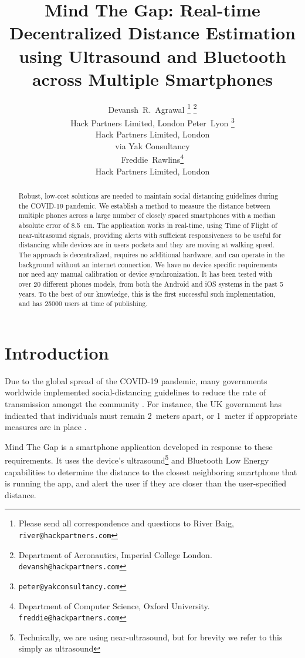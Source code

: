 \documentclass{article}
\title{Mind The Gap: Real-time Decentralized Distance Estimation using Ultrasound and Bluetooth across Multiple Smartphones}
\author{
  Devansh~R.~Agrawal \thanks{Please send all correspondence and questions to River Baig, \texttt{river@hackpartners.com}} \thanks{Department of Aeronautics, Imperial College London. \texttt{devansh@hackpartners.com}}\\
  Hack Partners Limited, London
   \And
 Peter~Lyon  \thanks{\texttt{peter@yakconsultancy.com}}\\
  Hack Partners Limited, London\\
  via Yak Consultancy
  \\
  \And
  Freddie~Rawlins\thanks{Department of Computer Science, Oxford University. \texttt{freddie@hackpartners.com}}\\
  Hack Partners Limited, London\\
  
}
\begin{document}
\maketitle

\begin{abstract}

Robust, low-cost solutions are needed to maintain social distancing guidelines during the COVID-19 pandemic. We establish a method to measure the distance between multiple phones across a large number of closely spaced smartphones with a median absolute error of 8.5~cm. The application works in real-time, using Time of Flight of near-ultrasound signals, providing alerts with sufficient responsiveness to be useful for distancing while devices are in users pockets and they are moving at walking speed. The approach is decentralized, requires no additional hardware, and can operate in the background without an internet connection. We have no device specific requirements nor need any manual calibration or device synchronization. It has been tested with over 20 different phones models, from both the Android and iOS systems in the past 5 years.
To the best of our knowledge, this is the first successful such implementation, and has 25000 users at time of publishing.
\end{abstract}



\section{Introduction}

Due to the global spread of the COVID-19 pandemic, many governments worldwide implemented social-distancing guidelines to reduce the rate of transmission amongst the community \cite{WHO2020}. For instance, the UK government has indicated that individuals must remain 2~meters apart, or 1~meter if appropriate measures are in place \cite{UKGuidance}. 

Mind The Gap is a smartphone application developed in response to these requirements. It uses the device's ultrasound\footnote{Technically, we are using near-ultrasound, but for brevity we refer to this simply as ultrasound} and Bluetooth Low Energy capabilities to determine the distance to the closest neighboring smartphone that is running the app, and alert the user if they are closer than the user-specified distance.
\end{document}
